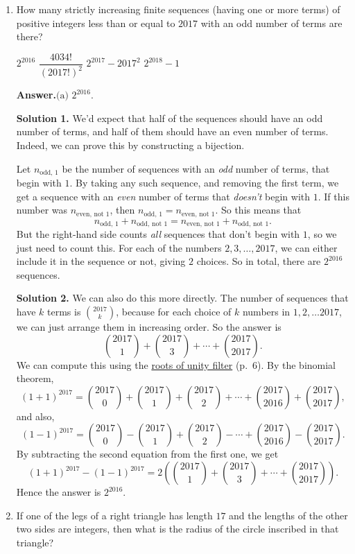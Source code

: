 \documentclass[11pt,paper=letter]{scrartcl}
\newcommand{\ans}{{\sffamily \bfseries Answer.}\;}
\newcommand{\ansb}[2]{\ans\(\boxed{\text{(#1) #2}}\).}
\newcommand{\soln}[1]{{\sffamily \bfseries Solution #1.}\;}
\begin{document}
\begin{enumerate}[left=0pt]
\item How many strictly increasing finite sequences (having one or more terms) of positive integers less than or equal to $2017$ with an odd number of terms are there?

\fourch
{$2^{2016}$}
{$\dfrac{4034!}{\left(2017!\right)^2}$}
{$2^{2017} - 2017^{2}$}
{$2^{2018} - 1$}

\ansb{a}{$2^{2016}$}

\soln1 We'd expect that half of the sequences should have an odd number of terms, and half of them should have an even number of terms. Indeed, we can prove this by constructing a bijection.

Let $n_{\text{odd},\,1}$ be the number of sequences with an \textit{odd} number of terms, that begin with $1$. By taking any such sequence, and removing the first term, we get a sequence with an \textit{even} number of terms that \textit{doesn't} begin with $1$. If this number was $n_{\text{even},\,\text{not }1}$, then $n_{\text{odd},\,1} = n_{\text{even},\,\text{not }1}$. So this means that \[
  n_{\text{odd},\,1} + n_{\text{odd},\,\text{not }1}
  = n_{\text{even},\,\text{not }1} + n_{\text{odd},\,\text{not }1}.
\]
But the right-hand side counts \textit{all} sequences that don't begin with $1$, so we just need to count this. For each of the numbers $2, 3, \ldots, 2017$, we can either include it in the sequence or not, giving $2$ choices. So in total, there are $2^{2016}$ sequences.

\soln2 We can also do this more directly. The number of sequences that have $k$ terms is $\displaystyle \binom{2017}{k}$, because for each choice of $k$ numbers in $1, 2, \ldots 2017$, we can just arrange them in increasing order. So the answer is \[
  \binom{2017}{1} + \binom{2017}{3} + \cdots + \binom{2017}{2017}.
\]
We can compute this using the \href{http://web.evanchen.cc/handouts/Summation/Summation.pdf}{roots of unity filter} (p.~6). By the binomial theorem, \[
  (1 + 1)^{2017} = \binom{2017}{0} + \binom{2017}{1} + \binom{2017}{2} + \cdots + \binom{2017}{2016} + \binom{2017}{2017},
\]
and also, \[
  (1 - 1)^{2017} = \binom{2017}{0} - \binom{2017}{1} + \binom{2017}{2} - \cdots + \binom{2017}{2016} - \binom{2017}{2017}.
\]
By subtracting the second equation from the first one, we get \[
  (1 + 1)^{2017} - (1 - 1)^{2017} = 2\left(\binom{2017}{1} + \binom{2017}{3} + \cdots + \binom{2017}{2017}\right).
\]
Hence the answer is $2^{2016}$.

\item If one of the legs of a right triangle has length $17$ and the lengths of the other two sides are integers, then what is the radius of the circle inscribed in that triangle?


\end{enumerate}
\end{document}
